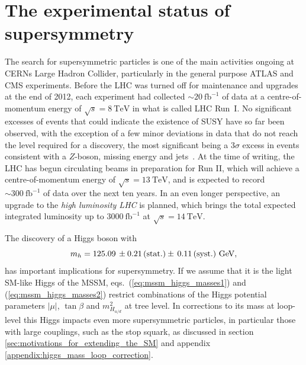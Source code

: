 \documentclass[twoside,english]{uiofysmaster}
\begin{document}
\section{The experimental status of supersymmetry}
The search for supersymmetric particles is one of the main activities ongoing at CERNs Large Hadron Collider, particularly in the general purpose ATLAS and CMS experiments. Before the LHC was turned off for maintenance and upgrades at the end of 2012, each experiment had collected $\sim 20 ~\mathrm{fb}^{-1}$ of data at a centre-of-momentum energy of $\sqrt{s} = 8~\mathrm{TeV}$ in what is called LHC Run~I. No significant excesses of events that could indicate the existence of SUSY have so far been observed, with the exception of a few minor deviations in data that do not reach the level required for a discovery, the most significant being a $3\sigma$ excess in events consistent with a $Z$-boson, missing energy and jets~\cite{Aad:2015wqa}. At the time of writing, the LHC has begun circulating beams in preparation for Run II, which will achieve a centre-of-momentum energy of $\sqrt{s} = 13~\mathrm{TeV}$, and is expected to record $\sim 300 ~\mathrm{fb}^{-1}$ of data over the next ten years. In an even longer perspective, an upgrade to the {\it high luminosity LHC} is planned, which brings the total expected integrated luminosity up to $3000~\mathrm{fb}^{-1}$ at $\sqrt{s} = 14~\mathrm{TeV}$. 

The discovery of a Higgs boson with~\cite{Aad:2015zhl}
\begin{equation}
m_h = 125.09\,\pm 0.21\, (\rm{stat.})\pm\, 0.11\, (\rm{syst.})~{\rm GeV,}
\label{eq:higgsmass}
\end{equation}
has important implications for supersymmetry. If we assume that it is the light SM-like Higgs of the MSSM, eqs.\ (\ref{eq:mssm_higgs_masses1}) and (\ref{eq:mssm_higgs_masses2}) restrict combinations of the Higgs potential parameters $|\mu|$, $\tan\beta$ and $m^2_{H_{u/d}}$ at tree level. In corrections to its mass at loop-level this Higgs impacts even more supersymmetric particles, in particular those with large couplings, such as the stop squark, as discussed in section \ref{sec:motivations_for_extending_the_SM} and appendix \ref{appendix:higgs_mass_loop_correction}.
\end{document}
